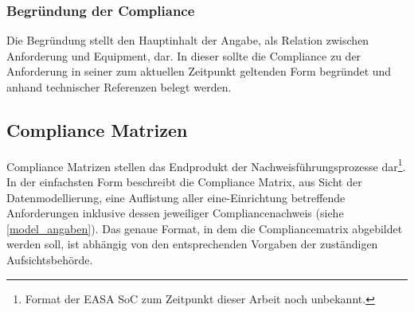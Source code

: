 \subsubsection{Begründung der Compliance}

Die Begründung stellt den Hauptinhalt der Angabe, als Relation zwischen Anforderung und Equipment, dar. 
In dieser sollte die Compliance zu der Anforderung in seiner zum aktuellen Zeitpunkt geltenden Form begründet und anhand technischer Referenzen belegt werden.




\subsection{Compliance Matrizen}

Compliance Matrizen stellen das Endprodukt der Nachweisführungsprozesse dar\footnote{Format der \ac{EASA} \ac{SoC} zum Zeitpunkt dieser Arbeit noch unbekannt.}.
In der einfachsten Form beschreibt die Compliance Matrix, aus Sicht der Datenmodellierung, eine Auflistung aller eine\atmans-Einrichtung betreffende Anforderungen inklusive dessen jeweiliger Compliancenachweis (siehe \ref{model_angaben}).
Das genaue Format, in dem die Compliancematrix abgebildet werden soll, ist abhängig von den entsprechenden Vorgaben der zuständigen Aufsichtsbehörde.






